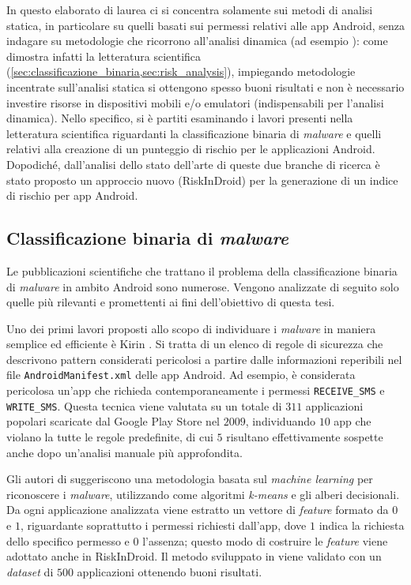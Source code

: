 \documentclass[12pt,a4paper,oneside]{article}
\begin{document}
In questo elaborato di laurea ci si concentra solamente sui metodi di analisi statica, in particolare su quelli basati sui permessi relativi alle app Android, senza indagare su metodologie che ricorrono all'analisi dinamica (ad esempio \cite{CROWDROID}): come dimostra infatti la letteratura scientifica (\cref{sec:classificazione_binaria,sec:risk_analysis}), impiegando metodologie incentrate sull'analisi statica si ottengono spesso buoni risultati e non è necessario investire risorse in dispositivi mobili e/o emulatori (indispensabili per l'analisi dinamica). Nello specifico, si è partiti esaminando i lavori presenti nella letteratura scientifica riguardanti la classificazione binaria di \textit{malware} e quelli relativi alla creazione di un punteggio di rischio per le applicazioni Android. Dopodiché, dall'analisi dello stato dell'arte di queste due branche di ricerca è stato proposto un approccio nuovo (RiskInDroid) per la generazione di un indice di rischio per app Android.



\subsection{Classificazione binaria di \textit{malware}}\label{sec:classificazione_binaria}

Le pubblicazioni scientifiche che trattano il problema della classificazione binaria di \textit{malware} in ambito Android sono numerose. Vengono analizzate di seguito solo quelle più rilevanti e promettenti ai fini dell'obiettivo di questa tesi.
\newline

Uno dei primi lavori proposti allo scopo di individuare i \textit{malware} in maniera semplice ed efficiente è Kirin \cite{KIRIN}. Si tratta di un elenco di regole di sicurezza che descrivono pattern considerati pericolosi a partire dalle informazioni reperibili nel file \texttt{AndroidManifest.xml} delle app Android. Ad esempio, è considerata pericolosa un'app che richieda contemporaneamente i permessi \texttt{RECEIVE\_SMS} e \texttt{WRITE\_SMS}. Questa tecnica viene valutata su un totale di $311$ applicazioni popolari scaricate dal Google Play Store nel $2009$, individuando $10$ app che violano la tutte le regole predefinite, di cui $5$ risultano effettivamente sospette anche dopo un'analisi manuale più approfondita.
\newline

Gli autori di \cite{PERMISSION_FEATURES} suggeriscono una metodologia basata sul \textit{machine learning} per riconoscere i \textit{malware}, utilizzando come algoritmi \textit{k-means} e gli alberi decisionali. Da ogni applicazione analizzata viene estratto un vettore di \textit{feature} formato da $0$ e $1$, riguardante soprattutto i permessi richiesti dall'app, dove $1$ indica la richiesta dello specifico permesso e $0$ l'assenza; questo modo di costruire le \textit{feature} viene adottato anche in RiskInDroid. Il metodo sviluppato in \cite{PERMISSION_FEATURES} viene validato con un \textit{dataset} di $500$ applicazioni ottenendo buoni risultati.
\newline
\end{document}
